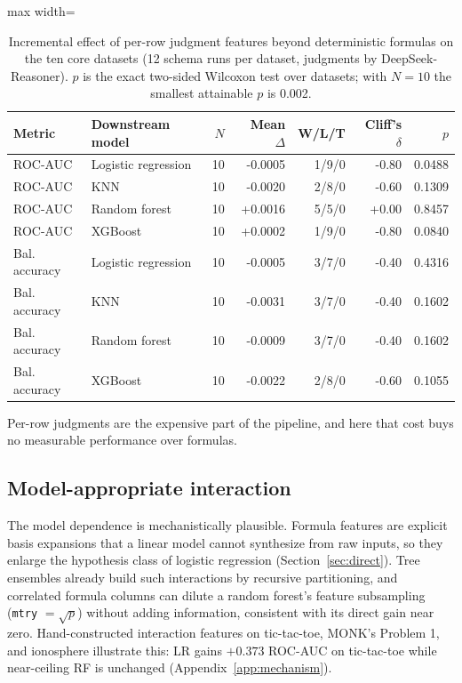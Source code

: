 \begin{table}[tbp]
\caption{Incremental effect of per-row judgment features beyond deterministic formulas on the ten core datasets (12 schema runs per dataset, judgments by DeepSeek-Reasoner). $p$ is the exact two-sided Wilcoxon test over datasets; with $N = 10$ the smallest attainable $p$ is 0.002.}\label{tab:judgment}
\centering
\small
\begin{adjustbox}{max width=\linewidth}
\begin{tabular}{llrrrrr}
\toprule
Metric & Downstream model & \(N\) & Mean \(\Delta\) & W/L/T & Cliff's \(\delta\) & \(p\) \\
\midrule
ROC-AUC & Logistic regression & 10 & -0.0005 & 1/9/0 & -0.80 & 0.0488 \\
ROC-AUC & KNN & 10 & -0.0020 & 2/8/0 & -0.60 & 0.1309 \\
ROC-AUC & Random forest & 10 & +0.0016 & 5/5/0 & +0.00 & 0.8457 \\
ROC-AUC & XGBoost & 10 & +0.0002 & 1/9/0 & -0.80 & 0.0840 \\
\midrule
Bal. accuracy & Logistic regression & 10 & -0.0005 & 3/7/0 & -0.40 & 0.4316 \\
Bal. accuracy & KNN & 10 & -0.0031 & 3/7/0 & -0.40 & 0.1602 \\
Bal. accuracy & Random forest & 10 & -0.0009 & 3/7/0 & -0.40 & 0.1602 \\
Bal. accuracy & XGBoost & 10 & -0.0022 & 2/8/0 & -0.60 & 0.1055 \\
\bottomrule
\end{tabular}
\end{adjustbox}
\end{table}

Per-row judgments are the expensive part of the pipeline, and here that cost buys no measurable performance over formulas.

\subsection{Model-appropriate interaction}\label{sec:model-appropriate-interaction}

The model dependence is mechanistically plausible. Formula features are explicit basis expansions that a linear model cannot synthesize from raw inputs, so they enlarge the hypothesis class of logistic regression (Section~\ref{sec:direct}). Tree ensembles already build such interactions by recursive partitioning, and correlated formula columns can dilute a random forest's feature subsampling (\texttt{mtry} \(= \sqrt{p}\)) without adding information, consistent with its direct gain near zero. Hand-constructed interaction features on tic-tac-toe, MONK's Problem 1, and ionosphere illustrate this: LR gains \(+0.373\) ROC-AUC on tic-tac-toe while near-ceiling RF is unchanged (Appendix~\ref{app:mechanism}).

